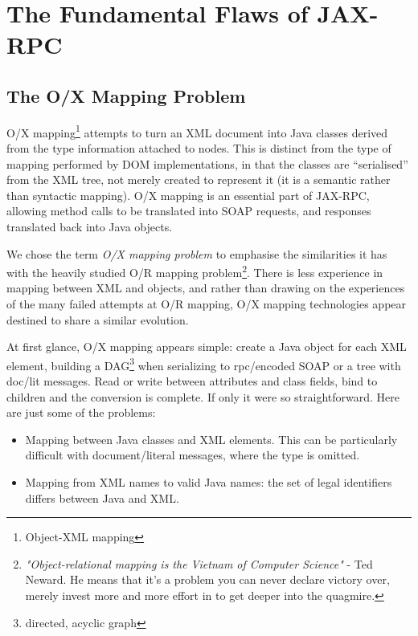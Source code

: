 \section{The Fundamental Flaws of JAX-RPC}
\label{objections}

\subsection{The O/X Mapping Problem}
\label{objections:o-x}

O/X mapping\footnote{Object-XML mapping} attempts to turn an XML
document into Java classes derived from the type information attached to
nodes. This is distinct from the type of mapping performed by DOM
implementations, in that the classes are ``serialised'' from the XML
tree, not merely created to represent it (it is a semantic rather than
syntactic mapping). O/X mapping is an essential part of JAX-RPC,
allowing method calls to be translated into SOAP requests, and responses
translated back into Java objects.

We chose the term \emph{O/X mapping problem} to emphasise the
similarities it has with the heavily studied O/R mapping
problem\footnote{ \emph{"Object-relational mapping is the Vietnam of
Computer Science"} - Ted Neward. He means that it's a problem you can
never declare victory over, merely invest more and more effort in to
get deeper into the quagmire.
}.  There is less experience in mapping between XML and objects, and
rather than drawing on the experiences of the many failed attempts at
O/R mapping, O/X mapping technologies appear destined to share a
similar evolution.

At first glance, O/X mapping appears simple: create a Java object
for each XML element, building a DAG\footnote{directed, acyclic graph}
when serializing to rpc/encoded SOAP or a tree with doc/lit
messages. Read or write between attributes and class fields, bind to
children and the conversion is complete. If only it were so
straightforward. Here are just some of the problems:


\begin{itemize}

\item Mapping between Java classes and XML elements. This can be
particularly difficult with document/literal messages, where the type
is omitted.

\item Mapping from XML names to valid Java names: the set of legal
identifiers differs between Java and XML.

\end{itemize}

